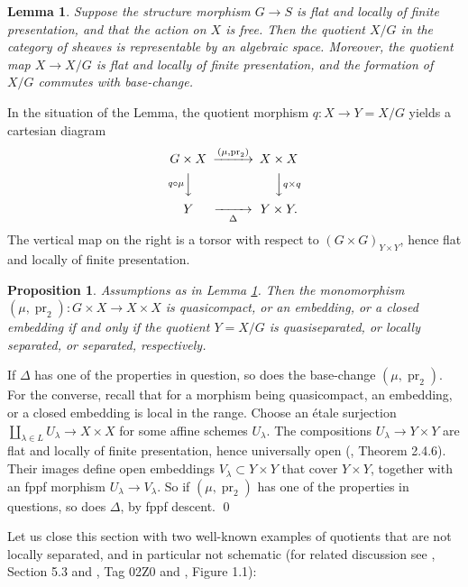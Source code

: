 \documentclass[oneside, 12pt]{amsart}
\newcommand\mylabel[1]{\label{#1}\marginpar{\raggedright\vspace{-1ex}\medskip\medskip\footnotesize \tt #1}}
\renewcommand\mylabel[1]{\label{#1}}
\newtheorem{lemma}[theorem]{Lemma}
\newtheorem{proposition}[theorem]{Proposition}
\theoremstyle{definition}
\theoremstyle{remark}
\newcommand{\pr}{\operatorname{pr}}
\newcommand{\ra}{\rightarrow}
\begin{document}
\begin{lemma}
\mylabel{quotient}
Suppose the   structure morphism  $G\ra S$ is  flat and locally of finite presentation,
and that the  action on $X$ is free.
Then the   quotient   $X/G$ in the category of sheaves is representable by an algebraic space. Moreover,
the quotient map $X\ra X/G$ is flat and locally of finite presentation, and the formation of $X/G$ commutes
with base-change. 
\end{lemma}


\medskip
In the situation of the Lemma, the quotient morphism $q:X\ra Y=X/G$ yields a cartesian diagram
$$
\begin{CD}
G\times X   @>(\mu,\pr_2)>>      X\times X\\
@Vq\circ\mu VV                        @VVq\times qV\\
Y           @>>\Delta>      Y\times Y.
\end{CD}
$$
The vertical map on the right is a torsor with respect to $(G\times G)_{Y\times Y}$, hence flat and locally of finite presentation.


\begin{proposition}
\mylabel{separation conditions}
Assumptions as in Lemma \ref{quotient}. Then  the monomorphism $(\mu,\pr_2):G\times X\ra X\times X$ is quasicompact, or an embedding,  or a closed embedding
if and only if the quotient $Y=X/G$ is quasiseparated, or locally separated,  or separated, respectively.
\end{proposition}

\proof
If $\Delta$ has one of the properties in question, so does the base-change $(\mu,\pr_2)$. 
For the converse, recall 
that for a morphism  being quasicompact, an   embedding,  or a closed  embedding is local in the range.
Choose an \'etale surjection $\amalg_{\lambda\in L} U_\lambda\ra X\times X$ for some affine schemes $U_\lambda$.
The compositions $U_\lambda\ra Y\times Y$ are flat and locally of finite presentation, hence universally open (\cite{EGA IVb}, Theorem 2.4.6).
Their images define open embeddings $V_\lambda\subset Y\times Y$ that cover $Y\times Y$, together with an fppf morphism $U_\lambda\ra V_\lambda$.
So if $(\mu,\pr_2)$ has one of the properties in questions, so does $\Delta$, by fppf descent.
\qed

\medskip
Let us close this section with two well-known examples of quotients   that are not locally separated, and in particular not schematic
(for related discussion see \cite{Olsson 2016},  Section 5.3 and \cite{SP}, Tag 02Z0 and \cite{Artin 1974}, Figure 1.1):
\end{document}
